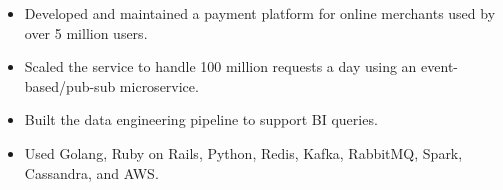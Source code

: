  {
    \begin{itemize}
        \item Developed and maintained a payment platform for online merchants
              used by over 5 million users.
        \item Scaled the service to handle 100 million requests a day using an
              event-based/pub-sub microservice.
        \item Built the data engineering pipeline to support BI queries.
        \item Used Golang, Ruby on Rails, Python, Redis, Kafka, RabbitMQ, Spark,
              Cassandra, and AWS.
    \end{itemize}
}
